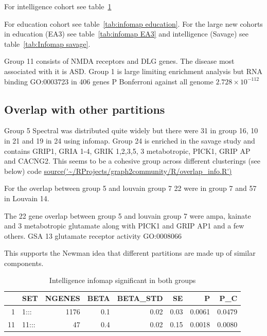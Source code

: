 For intelligence cohort see table~\ref{tab:Infomap Intelligence infomap significant in both groups}

For education cohort see table~\ref{tab:infomap education}. For the large new cohorts in education (EA3) see table~\ref{tab:infomap EA3} and intelligence (Savage) see table~\ref{tab:Infomap savage}.

Group 11 consists of NMDA receptors and DLG genes. The disease most associated with it is ASD. Group 1 is large limiting enrichment analysis but RNA binding GO:0003723 in 406 genes P Bonferroni against all genome $2.728 \times 10^{-112}$ \subsection{Overlap with other partitions}

Group 5 Spectral was distributed quite widely but there were 31 in group 16, 10 in 21 and 19 in 24 using infomap. Group 24 is enriched in the savage study and contains GRIP1, GRIA 1-4, GRIK 1,2,3,5, 3 metabotropic, PICK1, GRIP AP and CACNG2. This seems to be a cohesive group across different clusterings (see below) code \url{source('~/RProjects/graph2community/R/overlap_info.R')}


For the overlap between group 5 and louvain group 7 22 were in group 7 and 57 in Louvain 14.

The 22 gene overlap between group 5 and louvain group 7 were ampa, kainate and 3 metabotropic glutamate along with PICK1 and GRIP AP1 and a few others. GSA 13 glutamate receptor activity GO:0008066 

This supports the Newman idea that different partitions are made up of similar components. 





\begin{table}[ht]
\centering
\begin{tabular}{rlrrrrrr}
  \hline
 & SET & NGENES & BETA & BETA\_STD & SE & P & P\_C \\ 
  \hline
1 & 1::: & 1176 & 0.1 & 0.02 & 0.03 & 0.0061 & 0.0479 \\ 
  11 & 11::: & 47 & 0.4 & 0.02 & 0.15 & 0.0018 & 0.0080 \\ 
   \hline
\end{tabular}
\caption{Intelligence infomap significant in both groups}
\label{tab:Infomap Intelligence infomap significant in both groups}
\end{table}

